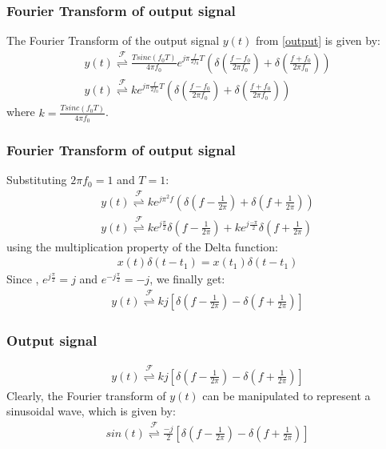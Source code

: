 \documentclass{beamer}
\providecommand{\sbrak}[1]{\ensuremath{{}\left[#1\right]}}
\providecommand{\brak}[1]{\ensuremath{\left(#1\right)}}
\providecommand{\fourier}{\overset{\mathcal{F}}{ \rightleftharpoons}}
\begin{document}
\begin{frame}
\frametitle{Fourier Transform of output signal}
The Fourier Transform of the output signal $y(t)$ from \eqref{output} is given by:
 \begin{align}
     y(t) \fourier \frac{Tsinc( f_0 T)}{4\pi f_0}e^{j\pi \frac{f}{2f_0}T}\brak{\delta\brak{\frac{f - f_0}{2\pi f_0}} + \delta\brak{\frac{f + f_0}{2\pi f_0}}}\\
     y(t) \fourier ke^{j\pi \frac{f}{2f_0}T}\brak{\delta\brak{\frac{f - f_0}{2\pi f_0}} + \delta\brak{\frac{f + f_0}{2\pi f_0}}}
 \end{align}
 where $k = \frac{Tsinc( f_0T)}{4\pi f_0}$.
\end{frame}
\begin{frame}
    \frametitle{Fourier Transform of output signal}
    \begin{flushleft}
    Substituting $2\pi f_0 = 1$ and $T = 1$:
 \begin{align}
     y(t) \fourier ke^{j\pi^2f}\brak{\delta\brak{f - \frac{1}{2\pi}} + \delta\brak{f + \frac{1}{2\pi}}}\\
     y(t) \fourier ke^{j\frac{\pi}{2}}\delta\brak{f - \frac{1}{2\pi}} +ke^{j\frac{-\pi}{2}}\delta\brak{f + \frac{1}{2\pi}}
 \end{align}
 using the multiplication property of the Delta function:
 \begin{align}
     x(t)\delta(t - t_1) = x(t_1)\delta(t - t_1)
 \end{align}
 Since , $e^{j\frac{\pi}{2}} = j$ and $e^{-j\frac{\pi}{2}} = -j$, we finally get:
 \begin{align}
 y(t) \fourier kj\sbrak{\delta\brak{f - \frac{1}{2\pi}} - \delta\brak{f + \frac{1}{2\pi}}}
 \end{align}
    \end{flushleft}
\end{frame}
\begin{frame}
\frametitle{Output signal}
\begin{flushleft}
\begin{align}
    y(t) \fourier kj\sbrak{\delta\brak{f - \frac{1}{2\pi}} - \delta\brak{f + \frac{1}{2\pi}}}
\end{align}
Clearly, the Fourier transform of $y(t)$ can  be  manipulated  to  represent  a  sinusoidal  wave,  which  is given by:
 \begin{align}
     sin(t) \fourier \frac{-j}{2}\sbrak{\delta\brak{f-\frac{1}{2\pi}} - \delta\brak{f + \frac{1}{2\pi}}}
 \end{align}
\end{flushleft}
\end{frame}
\end{document}
